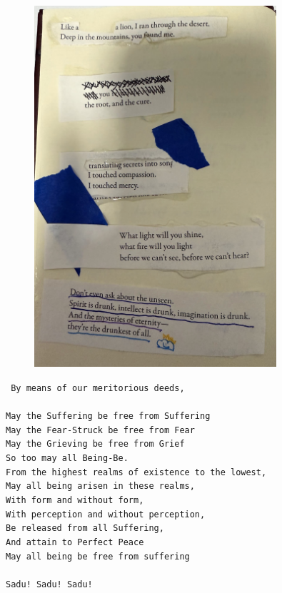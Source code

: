 \documentclass[12pt]{book}
\begin{document}
\begin{figure}
    \centering
    \includegraphics[width=0.8\textwidth]{figures/rumi_gold.png}
    \caption{\cite{gafori}}
\end{figure}

\clearpage
\label{outchant}
\thispagestyle{plain}

\texttt{
By means of our meritorious deeds,\\
\\
May the Suffering be free from Suffering\\
May the Fear-Struck be free from Fear\\
May the Grieving be free from Grief\\
So too may all Being-Be.\\
From the highest realms of existence to the lowest,\\
May all being arisen in these realms,\\
With form and without form,\\
With perception and without perception,\\
Be released from all Suffering,\\
And attain to Perfect Peace\\
May all being be free from suffering\\
\\
Sadu! Sadu! Sadu!
}
\end{document}
